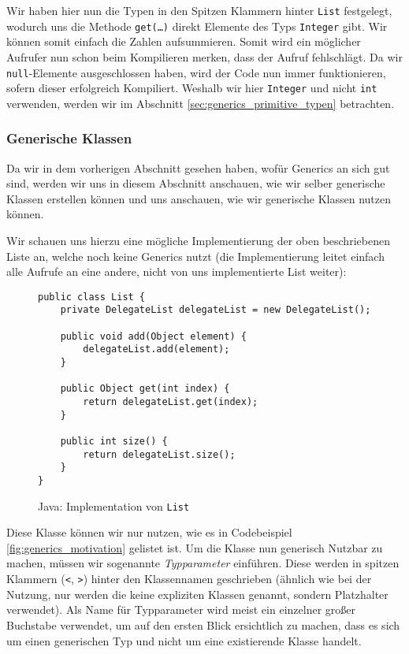 		Wir haben hier nun die Typen in den Spitzen Klammern hinter \texttt{List} festgelegt, wodurch uns die Methode \texttt{get(\dots)} direkt Elemente des Typs \texttt{Integer} gibt. Wir können somit einfach die Zahlen aufsummieren. Somit wird ein möglicher Aufrufer nun schon beim Kompilieren merken, dass der Aufruf fehlschlägt. Da wir \texttt{null}-Elemente ausgeschlossen haben, wird der Code nun immer funktionieren, sofern dieser erfolgreich Kompiliert. Weshalb wir hier \texttt{Integer} und nicht \texttt{int} verwenden, werden wir im Abschnitt \ref{sec:generics_primitive_typen} betrachten.

	\subsubsection{Generische Klassen}
		Da wir in dem vorherigen Abschnitt gesehen haben, wofür Generics an sich gut sind, werden wir uns in diesem Abschnitt anschauen, wie wir selber generische Klassen erstellen können und uns anschauen, wie wir generische Klassen nutzen können.
		
		Wir schauen uns hierzu eine mögliche Implementierung der oben beschriebenen Liste an, welche noch keine Generics nutzt (die Implementierung leitet einfach alle Aufrufe an eine andere, nicht von uns implementierte List weiter):
		\begin{figure}[H]
			\centering
			\begin{lstlisting}
public class List {
	private DelegateList delegateList = new DelegateList();

	public void add(Object element) {
		delegateList.add(element);
	}

	public Object get(int index) {
		return delegateList.get(index);
	}

	public int size() {
		return delegateList.size();
	}
}
			\end{lstlisting}
			\caption{Java: Implementation von \texttt{List}}
		\end{figure}
		
		Diese Klasse können wir nur nutzen, wie es in Codebeispiel \ref{fig:generics_motivation} gelistet ist. Um die Klasse nun generisch Nutzbar zu machen, müssen wir sogenannte \textit{Typparameter} einführen. Diese werden in spitzen Klammern (\texttt{<}, \texttt{>}) hinter den Klassennamen geschrieben (ähnlich wie bei der Nutzung, nur werden die keine expliziten Klassen genannt, sondern Platzhalter verwendet). Als Name für Typparameter wird meist ein einzelner großer Buchstabe verwendet, um auf den ersten Blick ersichtlich zu machen, dass es sich um einen generischen Typ und nicht um eine existierende Klasse handelt.
		
